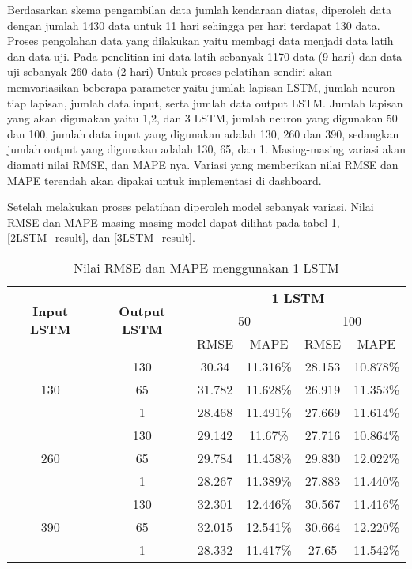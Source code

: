 \documentclass[../thesis.tex]{subfiles}
\begin{document}
Berdasarkan skema pengambilan data jumlah kendaraan diatas, diperoleh data dengan jumlah 1430 data untuk 11 hari sehingga per hari terdapat 130 data.
Proses pengolahan data yang dilakukan yaitu membagi data menjadi data latih dan data uji. Pada penelitian ini data latih sebanyak 1170 data (9 hari) dan data uji sebanyak 260 data (2 hari)
Untuk proses pelatihan sendiri akan memvariasikan beberapa parameter yaitu jumlah lapisan LSTM, jumlah neuron tiap lapisan, jumlah data input, serta jumlah data output LSTM. 
Jumlah lapisan yang akan digunakan yaitu 1,2, dan 3 LSTM, jumlah neuron yang digunakan 50 dan 100, jumlah data input yang digunakan adalah 130, 260 dan 390, sedangkan jumlah output yang digunakan adalah 130, 65, dan 1. Masing-masing 
variasi akan diamati nilai RMSE, dan MAPE nya. Variasi yang memberikan nilai RMSE dan MAPE terendah akan dipakai untuk implementasi di dashboard.

Setelah melakukan proses pelatihan diperoleh model sebanyak variasi. Nilai RMSE dan MAPE masing-masing model dapat dilihat pada tabel \ref{1LSTM_result}, \ref{2LSTM_result}, dan \ref{3LSTM_result}.
\begin{table}[htp]
\centering
\begin{tabular}{|c|c|c|c|c|c|}
	\hline 
	\multirow{3}{*}{\textbf{Input LSTM}} & \multirow{3}{*}{\textbf{Output LSTM}} & \multicolumn{4}{c|}{\textbf{1 LSTM}} \\ \cline{3-6}
	&  & \multicolumn{2}{c|}{50}& \multicolumn{2}{c|}{100} \\ \cline{3-6}
	& & RMSE & MAPE& RMSE & MAPE\\
	\hline
	\multirow{3}{*}{130} & 130 & 30.34& 11.316\%& 28.153 & 10.878\%\\
	& 65 & 31.782 & 11.628\% & 26.919 & 11.353\% \\
	& 1 & 28.468 & 11.491\% & 27.669 & 11.614\% \\
	\hline
	\multirow{3}{*}{260} & 130 & 29.142 & 11.67\%  & 27.716 & 10.864\%\\
	& 65 & 29.784 & 11.458\% & 29.830 & 12.022\%\\
	& 1 & 28.267 & 11.389\% & 27.883 & 11.440\% \\
	\hline
	\multirow{3}{*}{390} & 130 & 32.301 & 12.446\% & 30.567 & 11.416\% \\
	& 65 & 32.015 & 12.541\% & 30.664 & 12.220\% \\
	& 1 & 28.332 & 11.417\% & 27.65 & 11.542\% \\
	\hline
\end{tabular}
\caption{Nilai RMSE dan MAPE menggunakan 1 LSTM}
\label{1LSTM_result}
\end{table} 
\end{document}
